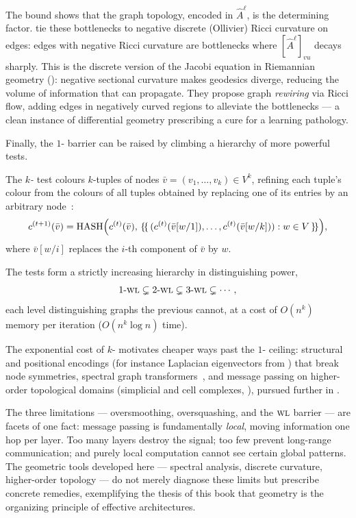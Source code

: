 The bound shows that the graph topology, encoded in $\hat A^\ell$, is the
determining factor. \citet{topping2022understanding} tie these bottlenecks to
negative discrete (Ollivier) Ricci curvature on edges: edges with negative Ricci
curvature are bottlenecks where $[\hat A^\ell]_{vu}$ decays sharply. This is the
discrete version of the Jacobi equation in Riemannian geometry ():
negative sectional curvature makes geodesics diverge, reducing the volume of
information that can propagate. They propose graph \emph{rewiring} via Ricci flow,
adding edges in negatively curved regions to alleviate the bottlenecks --- a clean
instance of differential geometry prescribing a cure for a learning pathology.

Finally, the $1$-\WL{} barrier can be raised by climbing a hierarchy of more
powerful tests.

\begin{definition}
\label{def:graphs:k-wl}
The \emph{$k$-\WL} test colours $k$-tuples of nodes
$\bar v = (v_1, \dots, v_k) \in V^k$, refining each tuple's colour from the
colours of all tuples obtained by replacing one of its entries by an arbitrary
node~\citep{morris2019weisfeiler}:
\[
  c^{(t+1)}(\bar v) = \operatorname{HASH}\!\Big(c^{(t)}(\bar v),\,
    \{\!\{\, (c^{(t)}(\bar v[w/1]), \dots, c^{(t)}(\bar v[w/k])) : w \in V \,\}\!\}\Big),
\]
where $\bar v[w/i]$ replaces the $i$-th component of $\bar v$ by $w$.
\end{definition}

\begin{proposition}
\label{prop:graphs:k-wl}
The tests form a strictly increasing hierarchy in distinguishing power,
\[
  1\text{-}\textsc{wl} \subsetneq 2\text{-}\textsc{wl} \subsetneq 3\text{-}\textsc{wl} \subsetneq \cdots,
\]
each level distinguishing graphs the previous cannot, at a cost of $O(n^k)$
memory per iteration ($O(n^k \log n)$ time).
\end{proposition}

The exponential cost of $k$-\WL{} motivates cheaper ways past the $1$-\WL{}
ceiling: structural and positional encodings (for instance Laplacian eigenvectors
from ) that break node symmetries, spectral graph
transformers~\citep{kreuzer2021spectral}, and message passing on higher-order
topological domains (simplicial and cell complexes, ),
pursued further in .

\medskip
The three limitations --- oversmoothing, oversquashing, and the $\textsc{wl}$ barrier ---
are facets of one fact: message passing is fundamentally \emph{local}, moving
information one hop per layer. Too many layers destroy the signal; too few prevent
long-range communication; and purely local computation cannot see certain global
patterns. The geometric tools developed here --- spectral analysis, discrete
curvature, higher-order topology --- do not merely diagnose these limits but
prescribe concrete remedies, exemplifying the thesis of this book that geometry is
the organizing principle of effective architectures.
